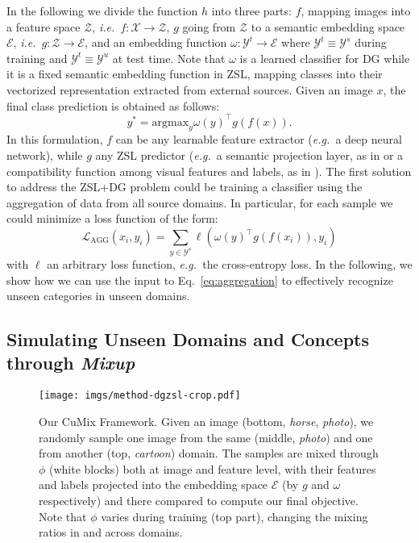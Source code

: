 \documentclass[runningheads]{llncs}
\newcommand{\eg}{\emph{e.g.~}}
\newcommand{\ie}{\emph{i.e.~}}
\newcommand{\methodName}{{CuMix} }
\begin{document}
In the following we divide the function $h$ into three parts: $f$, mapping images into a feature space $\mathcal{Z}$, \ie $f:\mathcal{X}\rightarrow \mathcal{Z}$, $g$ going from $\mathcal{Z}$ to a semantic embedding space $\mathcal{E}$, \ie $g:\mathcal{Z}\rightarrow \mathcal{E}$, and an embedding function {$\omega:\mathcal{Y}^t\rightarrow\mathcal{E}$} where $\mathcal{Y}^t\equiv\mathcal{Y}^s$ during training and $\mathcal{Y}^t\equiv\mathcal{Y}^u$ at test time. Note that $\omega$ is a learned classifier for DG while it is a fixed semantic embedding function in ZSL, mapping classes into their vectorized representation extracted from external sources.
Given an image $x$, the final class prediction is obtained as follows:
\begin{equation}
    y^{*} = \text{argmax}_{y} {\omega(y)}^{\intercal}g(f(x)).
\end{equation}
In this formulation, $f$ can be any learnable feature extractor (\eg a deep neural network), while $g$ any ZSL predictor {(\eg a semantic projection layer, as in \cite{xian2019semantic} or a compatibility function among visual features and labels, as in \cite{akata2013label,akata2015evaluation})}. 
The first solution {to address the ZSL+DG problem} could be training a classifier using the aggregation of data from all source domains. In particular, for each sample we could minimize a loss function of the form:
\begin{equation}
    \label{eq:aggregation}
    \mathcal{L}_{\text{AGG}}(x_i,y_i) = \sum_{y\in\mathcal{Y}^s} \ell(\omega(y)^\intercal g(f(x_i)),y_i)
\end{equation}
with $\ell$ an arbitrary loss function, \eg the cross-entropy loss. In the following, we show how we can use the input to Eq.~\eqref{eq:aggregation} to effectively recognize unseen categories in unseen domains.

\subsection{Simulating Unseen Domains and Concepts through \textit{Mixup}}

\begin{figure}[tb]
  \centering
  \texttt{[image: imgs/method-dgzsl-crop.pdf]} 
  \caption{Our \methodName Framework. Given an image (bottom, \textit{horse}, \textit{photo}), we randomly sample one image from the same (middle, \textit{photo}) and one from another (top, \textit{cartoon}) domain. The samples are mixed through $\phi$ (white blocks) both at image and feature level, with their features and labels projected into the embedding space $\mathcal{E}$ (by $g$ and $\omega$ respectively) and there compared to compute our final objective. Note that $\phi$ varies during training (top part), changing the mixing ratios in and across domains. }
  \label{fig:method}
 \end{figure}
 
\end{document}
